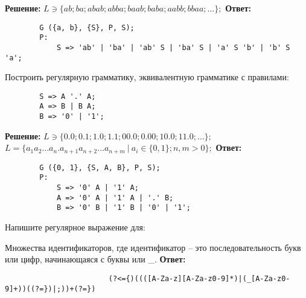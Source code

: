 \documentclass[]{article}
\begin{document}
\begin{enumerate}
\begin{item}
    \textbf{Решение:}
    \smallbreak
    $L \ni \{ ab; ba; abab; abba; baab; baba; aabb; bbaa; \dots \};$
    \bigbreak
    \textbf{Ответ:}
    \begin{lstlisting}
        G ({a, b}, {S}, P, S);
        P:
            S => 'ab' | 'ba' | 'ab' S | 'ba' S | 'a' S 'b' | 'b' S 'a';
    \end{lstlisting}
\end{item}

\begin{item}
    Построить регулярную грамматику, эквивалентную грамматике с правилами:
    \begin{lstlisting}
        S => A '.' A;
        A => B | B A;
        B => '0' | '1';
    \end{lstlisting}

    \textbf{Решение:}
    \smallbreak
    $L \ni \{ 0.0; 0.1; 1.0; 1.1; 00.0; 0.00; 10.0; 11.0; \dots \};$
    \hfill\break$L = \{ a_1 a_2 \dots a_n . a_{n+1} a_{n+2} \dots a_{n+m} \ |\  a_i \in \{ 0, 1 \}; n, m > 0 \};$
    \bigbreak
    \textbf{Ответ:}
    \begin{lstlisting}
        G ({0, 1}, {S, A, B}, P, S);
        P:
            S => '0' A | '1' A;
            A => '0' A | '1' A | '.' B;
            B => '0' B | '1' B | '0' | '1';
    \end{lstlisting}
\end{item}

\begin{item}
    Напишите регулярное выражение для:
    \begin{enumerate}

        \begin{item}
            Множества идентификаторов, где идентификатор – это последовательность букв или цифр, начинающаяся с буквы или \_.
            \bigbreak
            \textbf{Ответ:}
            \begin{enumerate}

                \begin{item}
                    \begin{lstlisting}
                        (?<={)((([A-Za-z][A-Za-z0-9]*)|(_[A-Za-z0-9]+))((?=})|;))+(?=})
                    \end{lstlisting}
                \end{item}


\end{enumerate}
\end{item}
\end{enumerate}
\end{item}
\end{enumerate}
\end{document}
